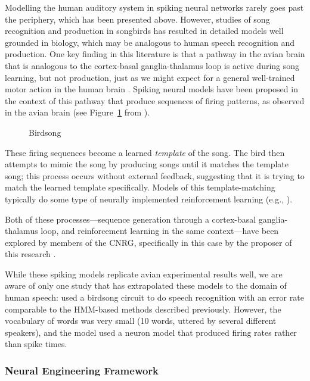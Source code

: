 \documentclass{article}
\begin{document}
Modelling the human auditory system
in spiking neural networks
rarely goes past the periphery,
which has been presented above.
However, studies of
song recognition and production
in songbirds has resulted in
detailed models well grounded in biology,
which may be analogous
to human speech recognition and production.
One key finding in this literature
is that a pathway in the avian brain
that is analogous to
the cortex-basal ganglia-thalamus loop
is active during song learning,
but not production,
just as we might expect
for a general well-trained motor action
in the human brain
\citep{fiete2008}.
Spiking neural models have been proposed
in the context of this pathway
that produce sequences of firing patterns,
as observed in the avian brain
(see Figure~\ref{fig:birdsong} from \citealp{fiete2008}).

\begin{figure}
  \begin{center}
  \end{center}
  \caption{Birdsong}
  \label{fig:birdsong}
\end{figure}

These firing sequences become
a learned \textit{template} of the song.
The bird then attempts to mimic the song
by producing songs until it matches
the template song;
this process occurs without
external feedback,
suggesting that it is trying
to match the learned template specifically.
Models of this template-matching
typically do some type of neurally
implemented reinforcement learning
(e.g., \citealp{fiete2007}).

Both of these processes---sequence generation
through a cortex-basal ganglia-thalamus loop,
and reinforcement learning in the same context---have
been explored by members of the CNRG,
specifically in this case by
the proposer of this research
\citep{stewart2012}.

While these spiking models
replicate avian experimental results well,
we are aware of only one study that
has extrapolated these models
to the domain of human speech:
\citet{yildiz2013} used a birdsong
circuit to do speech recognition
with an error rate comparable
to the HMM-based methods described previously.
However, the vocabulary of words was very small
(10 words, uttered by several different speakers),
and the model used a neuron model
that produced firing rates rather than spike times.

\subsubsection{Neural Engineering Framework}
\label{subsec:nef}
\end{document}
